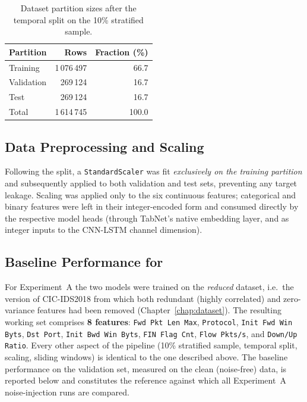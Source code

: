 \documentclass[../main.tex]{subfiles}
\begin{document}
\begin{table}[H]
\centering
\caption{Dataset partition sizes after the temporal split on the 10\% stratified sample.}
\label{tab:split-sizes}
\small
\begin{tabular}{lrr}
\toprule
\textbf{Partition} & \textbf{Rows}       & \textbf{Fraction (\%)} \\
\midrule
Training           & 1\,076\,497         & 66.7                   \\
Validation         & 269\,124            & 16.7                   \\
Test               & 269\,124            & 16.7                   \\
\midrule
Total              & 1\,614\,745         & 100.0                  \\
\bottomrule
\end{tabular}
\end{table}

\subsection{Data Preprocessing and Scaling}
\label{sec:preprocessing}

Following the split, a \texttt{StandardScaler} was fit \emph{exclusively on the training partition} and subsequently applied to both validation and test sets, preventing any target leakage. Scaling was applied only to the six continuous features; categorical and binary features were left in their integer-encoded form and consumed directly by the respective model heads (through TabNet's native embedding layer, and as integer inputs to the CNN-LSTM channel dimension).

\subsection{Baseline Performance for }
\label{sec:baseline-performance-A}

For Experiment~A the two models were trained on the \emph{reduced} dataset, i.e.\ the version of CIC-IDS2018 from which both redundant (highly correlated) and zero-variance features had been removed (Chapter~\ref{chap:dataset}).  The resulting working set comprises \textbf{8 features}: \texttt{Fwd Pkt Len Max}, \texttt{Protocol}, \texttt{Init Fwd Win Byts}, \texttt{Dst Port}, \texttt{Init Bwd Win Byts}, \texttt{FIN Flag Cnt}, \texttt{Flow Pkts/s}, and \texttt{Down/Up Ratio}.  Every other aspect of the pipeline (10\% stratified sample, temporal split, scaling, sliding windows) is identical to the one described above.  The baseline performance on the validation set, measured on the clean (noise-free) data, is reported below and constitutes the reference against which all Experiment~A noise-injection runs are compared.
\end{document}
